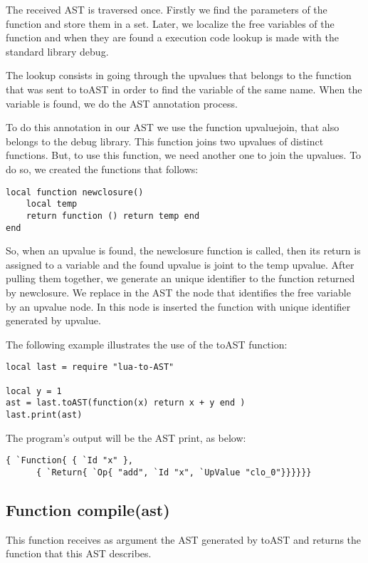 \documentclass[english]{llncs}
\begin{document}
The received AST is traversed once.
Firstly we find the parameters of the function and store them in a set.
Later, we localize the free variables of the  function and when they are found a execution code lookup is made with the standard library debug.

The lookup consists in going through the upvalues that belongs to the function that was sent to toAST in order to find the variable of the same name.
When the variable is found, we do the AST annotation process.

To do this annotation in our AST we use the function upvaluejoin, that also belongs to the debug library.
This function joins two upvalues of distinct functions.
But, to use this function, we need another one to join the upvalues. To do so, we created the functions that follows:


\begin{verbatim}
local function newclosure()
    local temp
    return function () return temp end
end
\end{verbatim}

So, when an upvalue is found, the newclosure function is called, then its return is assigned to a variable and the found upvalue is joint to the temp upvalue.
After pulling them together, we generate an unique identifier to the function returned by newclosure.
We replace in the AST the node that identifies the free variable by an upvalue node.
In this node is inserted the function with unique identifier generated by upvalue.


The following example illustrates the use of the toAST function:


\begin{verbatim}
local last = require "lua-to-AST"

local y = 1
ast = last.toAST(function(x) return x + y end )
last.print(ast)
\end{verbatim}


The program's output will be the AST print, as below:
\begin{verbatim}
{ `Function{ { `Id "x" },
      { `Return{ `Op{ "add", `Id "x", `UpValue "clo_0"}}}}}}
\end{verbatim}


\subsection{Function compile(ast) }


This function receives as argument the AST generated by toAST and returns the function that this AST describes.
\end{document}
